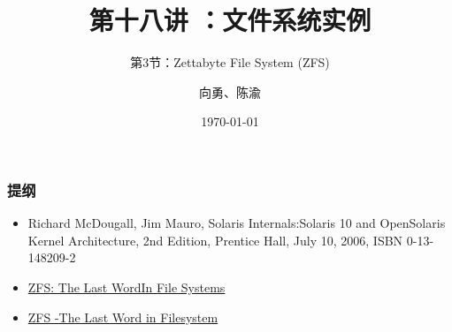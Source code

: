 


\title[第18讲]{第十八讲 ：文件系统实例} %
\subtitle{第3节：Zettabyte File System (ZFS)}
\author{向勇、陈渝} %
\date{\today} %



\begin{frame}
\titlepage %
\end{frame}

\begin{frame}
\frametitle{提纲} %
\tableofcontents %

    \begin{itemize}
        \item Richard McDougall, Jim Mauro, Solaris Internals:Solaris 10 and OpenSolaris Kernel Architecture, 2nd Edition, Prentice Hall, July 10, 2006, ISBN 0-13-148209-2
        \item \href{http://pages.cs.wisc.edu/~remzi/OSTEP/Citations/zfs_last.pdf}{ZFS: The Last WordIn File Systems}
        \item \href{https://nasa.cs.nctu.edu.tw/sa/2019/slides/14_ZFS.pdf}{ZFS -The Last Word in Filesystem}
    \end{itemize}

\end{frame}
% 
% 
% 
% 
